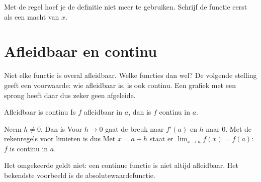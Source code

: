 Met de regel hoef je de definitie niet meer te gebruiken. Schrijf de functie eerst als een macht van $x$.


\begin{oefeningen}
\end{oefeningen}

\section{Afleidbaar en continu}

Niet elke functie is overal afleidbaar. Welke functies dan wel? De volgende stelling geeft een voorwaarde: wie afleidbaar is, is ook continu. Een grafiek met een sprong heeft daar dus zeker geen afgeleide.

\begin{theorie}
\begin{stelling}{Afleidbaar is continu}
Is $f$ afleidbaar in $a$, dan is $f$ continu in $a$.
\end{stelling}
\begin{bewijs}
Neem $h \neq 0$. Dan is
Voor $h \to 0$ gaat de breuk naar $f'(a)$ en $h$ naar $0$. Met de rekenregels voor limieten is dus
Met $x = a + h$ staat er $\lim_{x \to a} f(x) = f(a)$: $f$ is continu in $a$.
\end{bewijs}
\end{theorie}

Het omgekeerde geldt niet: een continue functie is niet altijd afleidbaar. Het bekendste voorbeeld is de absolutewaardefunctie.

